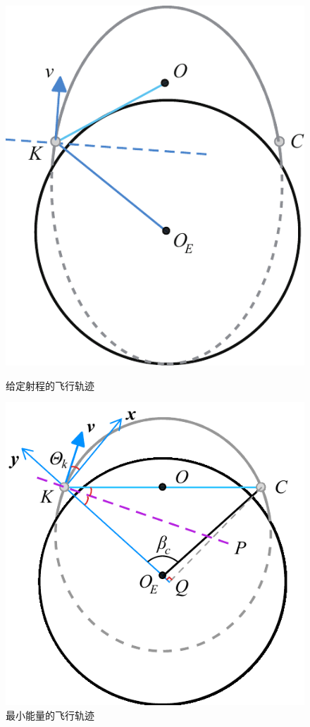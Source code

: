\begin{figure}[!htb]
	\centering
	\begin{minipage}{0.49\linewidth}
		\centering
		\includegraphics[width=0.63\linewidth]{pic/最小能量.pdf}
		\caption{给定射程的飞行轨迹}
		\label{最小能量1}
	\end{minipage}
	\begin{minipage}{0.49\linewidth}
		\centering
		\includegraphics[width=0.75\linewidth]{pic/最小能量2.pdf}
		\caption{最小能量的飞行轨迹}
		\label{最小能量2}
	\end{minipage}
\end{figure}

